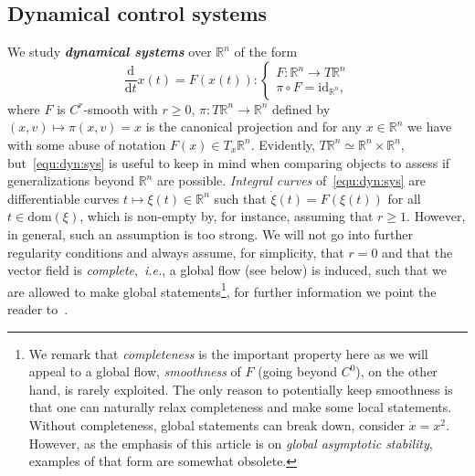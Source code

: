 \documentclass[letterpaper, 10 pt, conference]{ieeeconf}  %
\theoremstyle{mystyle}
\begin{document}
\subsection{Dynamical control systems}
We study \textit{\textbf{dynamical systems}} over $\mathbb{R}^n$ of the form
\begin{equation}
    \label{equ:dyn:sys}
    \frac{\mathrm{d}}{\mathrm{d}t}x(t)=F(x(t)) : \begin{cases}
        F:\mathbb{R}^n\to T\mathbb{R}^n\\
        \pi\circ F = \mathrm{id}_{\mathbb{R}^n},
    \end{cases}
\end{equation}
where $F$ is $C^r$-smooth with $r\geq 0$, $\pi:T\mathbb{R}^n\to \mathbb{R}^n$ defined by $(x,v)\mapsto \pi(x,v)=x$ is the canonical projection and for any $x\in \mathbb{R}^n$ we have with some abuse of notation $F(x)\in T_x\mathbb{R}^n$. Evidently, $T\mathbb{R}^n\simeq \mathbb{R}^n\times \mathbb{R}^n$, but~\eqref{equ:dyn:sys} is useful to keep in mind when comparing objects to assess if generalizations beyond $\mathbb{R}^n$ are possible. \textit{Integral curves} of~\eqref{equ:dyn:sys} are differentiable curves $t\mapsto \xi(t)\in \mathbb{R}^n$ such that $\dot{\xi}(t)=F(\xi(t))$ for all $t\in \mathrm{dom}(\xi)$, which is non-empty by, for instance, assuming that $r\geq 1$. However, in general, such an assumption is too strong. We will not go into further regularity conditions and always assume, for simplicity, that $r=0$ and that the vector field is \textit{complete},~\textit{i.e.}, a global flow (see below) is induced, such that we are allowed to make global statements\footnote{We remark that \textit{completeness} is the important property here as we will appeal to a global flow, \textit{smoothness} of $F$ (going beyond $C^0$), on the other hand, is rarely exploited. The only reason to potentially keep smoothness is that one can naturally relax completeness and make some local statements. Without completeness, global statements can break down, consider $\dot{x}=x^2$. However, as the emphasis of this article is on \textit{global asymptotic stability}, examples of that form are somewhat obsolete.}, for further information we point the reader to~\cite{ref:sontag2013mathematical,ref:hale2009ordinary}.
\end{document}
